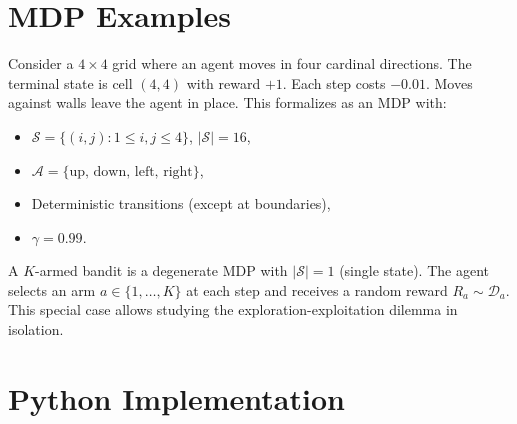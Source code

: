 \section{MDP Examples}

\begin{example}[Gridworld]
Consider a $4 \times 4$ grid where an agent moves in four cardinal directions.
The terminal state is cell $(4,4)$ with reward $+1$. Each step costs $-0.01$.
Moves against walls leave the agent in place. This formalizes as an MDP with:
\begin{itemize}
    \item $\mathcal{S} = \{(i,j) : 1 \leq i,j \leq 4\}$, $|\mathcal{S}| = 16$,
    \item $\mathcal{A} = \{\text{up, down, left, right}\}$,
    \item Deterministic transitions (except at boundaries),
    \item $\gamma = 0.99$.
\end{itemize}
\end{example}

\begin{example}
A $K$-armed bandit is a degenerate MDP with $|\mathcal{S}| = 1$ (single state).
The agent selects an arm $a \in \{1, \ldots, K\}$ at each step and receives a
random reward $R_a \sim \mathcal{D}_a$. This special case allows studying the
exploration-exploitation dilemma in isolation.
\end{example}

\section{Python Implementation}

